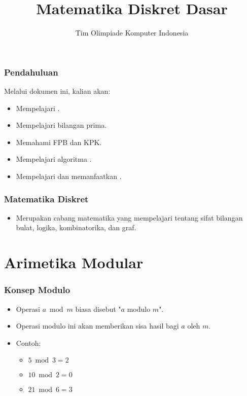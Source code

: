 

\title{Matematika Diskret Dasar}
\author{Tim Olimpiade Komputer Indonesia}
\date{}



\begin{frame}
\titlepage
\end{frame}

\begin{frame}
\frametitle{Pendahuluan}
Melalui dokumen ini, kalian akan:
\begin{itemize}
  \item Mempelajari .
  \item Mempelajari bilangan prima.
  \item Memahami FPB dan KPK.
  \item Mempelajari algoritma .
  \item Mempelajari dan memanfaatkan .
\end{itemize}
\end{frame}

\begin{frame}
\frametitle{Matematika Diskret}
\begin{itemize}
  \item Merupakan cabang matematika yang mempelajari tentang sifat bilangan bulat, logika, kombinatorika, dan graf.
\end{itemize}
\end{frame}

\section{Arimetika Modular}
\frame{\sectionpage}

\begin{frame}
\frametitle{Konsep Modulo}
\begin{itemize}
  \item Operasi $a \bmod m$ biasa disebut "$a$ modulo $m$".
  \item Operasi modulo ini akan memberikan sisa hasil bagi $a$ oleh $m$.
  \item Contoh: 
  \begin{itemize}
    \item $5 \bmod 3 = 2$ 
    \item $10 \bmod 2 = 0$
    \item $21 \bmod 6 = 3$
  \end{itemize}  
\end{itemize}
\end{frame}

